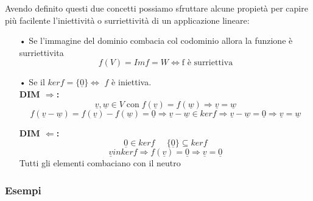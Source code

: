 Avendo definito questi due concetti possiamo sfruttare alcune propietà per capire più facilente l'iniettività o surriettività di un applicazione lineare:
\begin{itemize}
\item[•] Se l'immagine del dominio combacia col codominio allora la funzione è surriettivita
$$ f(V) = Im f = W \Leftrightarrow \text{f è surriettiva} $$

\item[•] Se il $ker f = \{\underline{0}\} \Leftrightarrow$ $f$ è iniettiva.\\

\subitem \textbf{DIM $\Rightarrow$:}
$$ \underline{v},\underline{w} \in V \; \text{con} \; f(\underline{v}) = f(\underline{w}) \Rightarrow \underline{v} = \underline{w} $$
$$ f(\underline{v}-\underline{w}) = f(\underline{v})-f(\underline{w}) = \underline{0} \Rightarrow \underline{v}-\underline{w} \in ker f \Rightarrow \underline{v}-\underline{w} = \underline{0} \Rightarrow \underline{v} = \underline{w}$$

\subitem \textbf{DIM $\Leftarrow$:}
$$ \underline{0} \in ker f \;\;\;\;\; \{\underline{0}\} \subseteq ker f $$
$$ \underline{v} in ker f \Rightarrow f(\underline{v}) = \underline{0} \Rightarrow \underline{v} = \underline{0} $$
Tutti gli elementi combaciano con il neutro

\end{itemize}


\subsubsection{Esempi}






